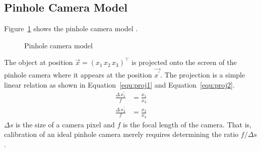 \documentclass[12pt,a4paper,oneside,openright]{book}
\newcommand{\Ie}{That is, }
\newcommand{\equ}[1]{Equation~\ref{equ:#1}}
\newcommand{\fig}[1]{Figure~\ref{fig:#1}}
\begin{document}
\begin{CJK}{UTF8}{}
\section{Pinhole Camera Model}\label{cha:camera}
\fig{pinhole} shows the pinhole camera model \citep{RefWorks:40}.
\begin{figure}[htbp]
  \begin{center}
    \caption{Pinhole camera model\label{fig:pinhole}}
  \end{center}
\end{figure}
The object at position $\vec{x}=(x_1\,x_2\,x_3)^\top$ is projected onto the screen of the pinhole camera where it appears at the position $\vec{x^\prime}$. The projection is a simple linear relation as shown in \equ{proj1} and \equ{proj2}.
\begin{align}
  \frac{\Delta\,x^\prime_1}{f}&=\frac{x_1}{x_3}\label{equ:proj1}\\
  \frac{\Delta\,x^\prime_2}{f}&=\frac{x_2}{x_3}\label{equ:proj2}
\end{align}
$\Delta s$ is the size of a camera pixel and $f$ is the focal length of the camera. \Ie calibration of an ideal pinhole camera merely requires determining the ratio $f/\Delta s$.


\end{CJK}
\end{document}
